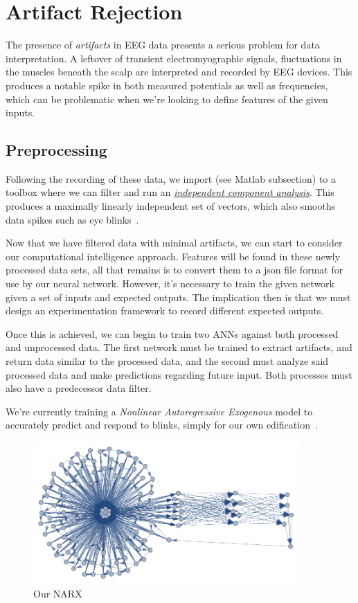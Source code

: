 \documentclass[twoside, 12pt]{article}
\theoremstyle{plain}
\begin{document}
\section{Artifact Rejection}
The presence of \textit{artifacts} in EEG data presents a serious problem for data interpretation. A leftover of transient electromyographic signals, fluctuations in the muscles beneath the scalp are interpreted and recorded by EEG devices. This produces a notable spike in both measured potentials as well as frequencies, which can be problematic when we're looking to define features of the given inputs.
\subsection{Preprocessing}
Following the recording of these data, we import (see Matlab subsection) to a toolbox where we can filter and run an \href{https://sccn.ucsd.edu/~jung/tutorial/runica.htm}{\textit{independent component analysis}}. This produces a maximally linearly independent set of vectors, which also smooths data spikes such as eye blinks~\cite{shwartz_ica_2004}.

Now that we have filtered data with minimal artifacts, we can start to consider our computational intelligence approach. Features will be found in these newly processed data sets, all that remains is to convert them to a json file format for use by our neural network. However, it's necessary to train the given network given a set of inputs and expected outputs. The implication then is that we must design an experimentation framework to record different expected outputs.

Once this is achieved, we can begin to train two ANNs against both processed and unprocessed data. The first network must be trained to extract artifacts, and return data similar to the processed data, and the second must analyze said processed data and make predictions regarding future input. Both processes must also have a predecessor data filter.

We're currently training a \textit{Nonlinear Autoregressive Exogenous} model to accurately predict and respond to blinks, simply for our own edification~\cite{xiu_multivariate_nodate}.

\begin{figure}[ht]
  \centering
  \includegraphics[width=4in]{narx.pdf}
  \caption{Our NARX}
  \label{fig:narx}
\end{figure}
\end{document}
